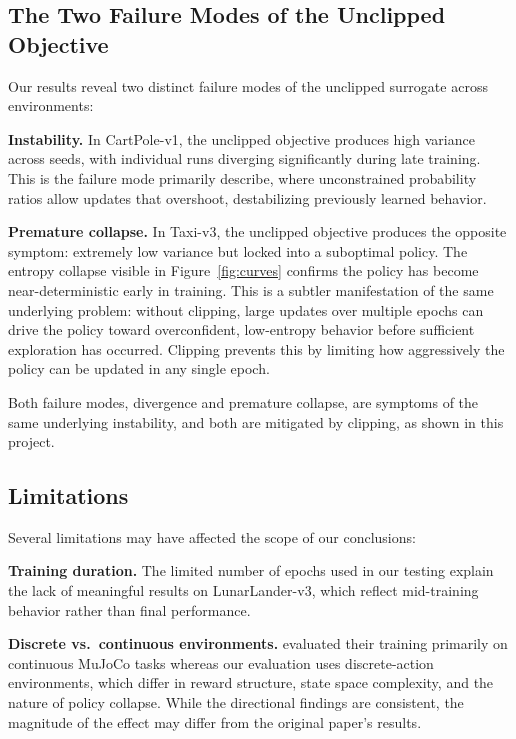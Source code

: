 \documentclass{article}
\begin{document}
\subsection{The Two Failure Modes of the Unclipped Objective}

Our results reveal two distinct failure modes of the unclipped surrogate across environments:

\textbf{Instability.} In CartPole-v1, the unclipped objective produces high variance across seeds, with individual runs diverging significantly during late training. This is the failure mode \citet{schulman2017ppo} primarily describe, where unconstrained probability ratios allow updates that overshoot, destabilizing previously learned behavior.

\textbf{Premature collapse.} In Taxi-v3, the unclipped objective produces the opposite symptom: extremely low variance but locked into a suboptimal policy. The entropy collapse visible in Figure~\ref{fig:curves} confirms the policy has become near-deterministic early in training. This is a subtler manifestation of the same underlying problem: without clipping, large updates over multiple epochs can drive the policy toward overconfident, low-entropy behavior before sufficient exploration has occurred. Clipping prevents this by limiting how aggressively the policy can be updated in any single epoch.

Both failure modes, divergence and premature collapse, are symptoms of the same underlying instability, and both are mitigated by clipping, as shown in this project.

\subsection{Limitations}

Several limitations may have affected the scope of our conclusions:

\textbf{Training duration.} The limited number of epochs used in our testing explain the lack of meaningful results on LunarLander-v3, which reflect mid-training behavior rather than final performance.

\textbf{Discrete vs.\ continuous environments.} \citet{schulman2017ppo} evaluated their training primarily on continuous MuJoCo tasks whereas our evaluation uses discrete-action environments, which differ in reward structure, state space complexity, and the nature of policy collapse. While the directional findings are consistent, the magnitude of the effect may differ from the original paper's results.
\end{document}
